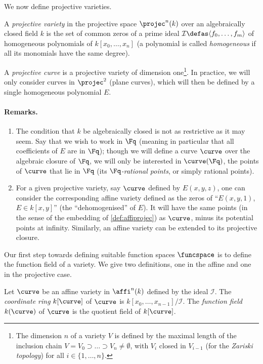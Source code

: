 We now define projective varieties.

\begin{defi}
A \emph{projective variety} in the projective space $\projec^n(k)$ over an algebraically closed field $k$ is the set of common zeros
of a prime ideal $\mathcal{I} \defas \langle f_0, \ldots, f_m \rangle$ of homogeneous polynomials of $k[x_0,\ldots,x_n]$ (a polynomial is called \emph{homogeneous}
if all its monomials have the same degree).
\end{defi}

A \emph{projective curve} is a projective variety of dimension one\footnote{The dimension $n$ of a variety $V$ is defined by
the maximal length of the inclusion chain $V = V_0 \supset \ldots \supset V_n \neq \emptyset$, with $V_i$ closed in $V_{i-1}$ (for the \emph{Zariski topology})
for all $i \in \{1,\ldots,n\}$.}. In practice, we will only consider curves in $\projec^2$ (plane curves),
which will then be defined by a single homogeneous polynomial $E$.

\paragraph{Remarks.}
\begin{enumerate}
\item The condition that $k$ be algebraically closed is not as restrictive as it may seem. Say that we wish to work in $\Fq$ (meaning in particular
that all coefficients of $E$ are in $\Fq$); though we will define a curve $\curve$ over the algebraic closure of $\Fq$, we
will only be interested in $\curve(\Fq)$, the points of $\curve$ that lie in $\Fq$ (its \emph{$\Fq$-rational points}, or simply rational points). 
\item For a given projective variety, say $\curve$ defined by $E(x,y,z)$, one can consider the corresponding affine variety defined as the zeros of ``$E(x,y,1)$,
$E \in k[x,y]$'' (the ``dehomogenised'' of $E$). It will have the same points (in the sense of the embedding of \autoref{def:affiprojec}) as $\curve$, minus its potential points at infinity.
Similarly, an affine variety can be extended to its projective closure.
\end{enumerate}

Our first step towards defining suitable function spaces $\funcspace$ is to define the function field of a variety.
We give two definitions, one in the affine and one in the projective case.

\begin{defi}
Let $\curve$ be an affine variety in $\affi^n(k)$ defined by the ideal $\mathcal{I}$. The \emph{coordinate ring} $k[\curve]$ of $\curve$ is $k[x_0, \ldots, x_{n-1}]/\mathcal{I}$.
The \emph{function field} $k(\curve)$ of $\curve$ is the quotient field of $k[\curve]$.
\end{defi}

